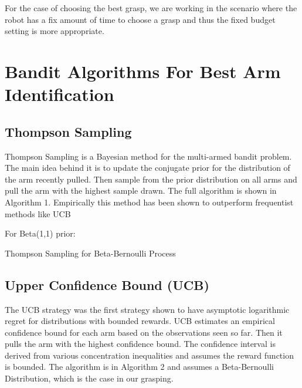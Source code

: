 \documentclass[letterpaper, 10 pt, conference]{ieeeconf}  %
\begin{document}
For the case of choosing the best grasp, we are working in the scenario where the robot has a fix amount of time to choose a grasp and thus the fixed budget setting is more appropriate.





\section{Bandit Algorithms For Best Arm Identification}\label{sec:algorithms}
\subsection{Thompson Sampling}
Thompson Sampling is a Bayesian method for the multi-armed bandit problem. The main idea behind it is to update the conjugate prior for the distribution of the arm recently pulled. Then sample from the prior distribution on all arms and pull the arm with the highest sample drawn. The full algorithm is shown in Algorithm 1.  Empirically this method has been shown to outperform frequentist methods like UCB \cite{chapelle2011empirical} 

\begin{algorithm}
 For Beta(1,1) prior: \\
 \caption{Thompson Sampling for Beta-Bernoulli Process}
\end{algorithm}


\subsection{Upper Confidence Bound (UCB)}
The UCB strategy was the first strategy shown to have asymptotic logarithmic regret \cite{lai1985asymptotically} for distributions with bounded rewards. UCB estimates an empirical confidence bound for each arm based on the observations seen so far. Then it pulls the arm with the highest confidence bound. The confidence interval is derived from various concentration inequalities and assumes the reward function is bounded. The algorithm is in Algorithm 2 and assumes a Beta-Bernoulli Distribution, which is the case in our grasping. 
\end{document}
